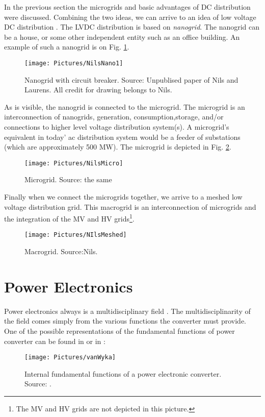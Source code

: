 \documentclass[]{scrartcl}
\begin{document}
In the previous section the microgrids and basic advantages of DC distribution were discussed. Combining the two ideas, we can arrive to an idea of low voltage DC distribution \cite{Mackay2015b}. The LVDC distribution is based on \emph{nanogrid}\cite{Mackay2015a}. The nanogrid can be a house, or some other independent entity such as an office building. An example of such a nanogrid is on Fig. \ref{fig:nilsnano1}.
\begin{figure}[h!]
\centering
\texttt{[image: Pictures/NilsNano1]}
\caption{Nanogrid with circuit breaker. Source: Unpublised paper of Nils and Laurens. All credit for drawing belongs to Nils.}
\label{fig:nilsnano1}
\end{figure}

As is visible, the nanogrid is connected to the microgrid. The microgrid is an interconnection of nanogrids, generation, consumption,storage, and/or connections to higher level voltage distribution
system(s). A microgrid’s equivalent in today' ac distribution system would be a feeder of substations (which are approximately 500 MW). The microgrid is depicted in Fig. \ref{fig:nilsmicro}.

\begin{figure}[h!]
\centering
\texttt{[image: Pictures/NilsMicro]}
\caption{Microgrid. Source: the same}
\label{fig:nilsmicro}
\end{figure}

Finally when we connect the microgrids together, we arrive to a meshed low voltage distribution grid.
This macrogrid is an interconnection of microgrids and the integration of the MV and HV grids\footnote{The MV and HV grids are not depicted in this picture.}.
\begin{figure}[h!]
\centering
\texttt{[image: Pictures/NIlsMeshed]}
\caption{Macrogrid. Source:Nils.}
\label{fig:nilsmeshed}
\end{figure}



\newpage
\section{Power Electronics}


Power electronics always is a multidisciplinary field \cite{Technology2015}. The multidisciplinarity of the field comes simply from the various functions the converter must provide. One of the possible representations of the fundamental functions of power converter can be found in \cite{Wyk2012} or in \cite{VanWyk2013}: 
\begin{figure}[h!]
\centering
\texttt{[image: Pictures/vanWyka]}
\caption{Internal fundamental functions of a power electronic converter. Source: \cite{Wyk2012}.}
\label{fig:vanwyka}
\end{figure}
\end{document}
